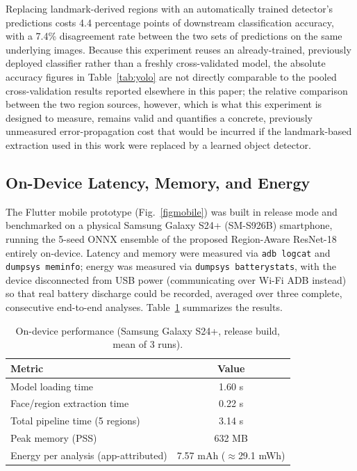 \documentclass[conference]{IEEEtran}
\begin{document}
Replacing landmark-derived regions with an automatically trained detector's predictions costs 4.4 percentage points of downstream classification accuracy, with a 7.4\% disagreement rate between the two sets of predictions on the same underlying images. Because this experiment reuses an already-trained, previously deployed classifier rather than a freshly cross-validated model, the absolute accuracy figures in Table~\ref{tab:yolo} are not directly comparable to the pooled cross-validation results reported elsewhere in this paper; the relative comparison between the two region sources, however, which is what this experiment is designed to measure, remains valid and quantifies a concrete, previously unmeasured error-propagation cost that would be incurred if the landmark-based extraction used in this work were replaced by a learned object detector.

\FloatBarrier
\subsection{On-Device Latency, Memory, and Energy}\label{sub-IV-h}

The Flutter mobile prototype (Fig.~\ref{figmobile}) was built in release mode and benchmarked on a physical Samsung Galaxy S24+ (SM-S926B) smartphone, running the 5-seed ONNX ensemble of the proposed Region-Aware ResNet-18 entirely on-device. Latency and memory were measured via \texttt{adb logcat} and \texttt{dumpsys meminfo}; energy was measured via \texttt{dumpsys batterystats}, with the device disconnected from USB power (communicating over Wi-Fi ADB instead) so that real battery discharge could be recorded, averaged over three complete, consecutive end-to-end analyses. Table~\ref{tab:mobile} summarizes the results.

\begin{table}[H]
\caption{On-device performance (Samsung Galaxy S24+, release build, mean of 3 runs).}
\begin{center}
\small
\begin{tabular}{|l|c|}
\hline
\textbf{Metric} & \textbf{Value} \\
\hline
Model loading time & 1.60 s \\
\hline
Face/region extraction time & 0.22 s \\
\hline
Total pipeline time (5 regions) & 3.14 s \\
\hline
Peak memory (PSS) & 632 MB \\
\hline
Energy per analysis (app-attributed) & 7.57 mAh ($\approx$29.1 mWh) \\
\hline
\end{tabular}
\label{tab:mobile}
\end{center}
\end{table}
\end{document}
